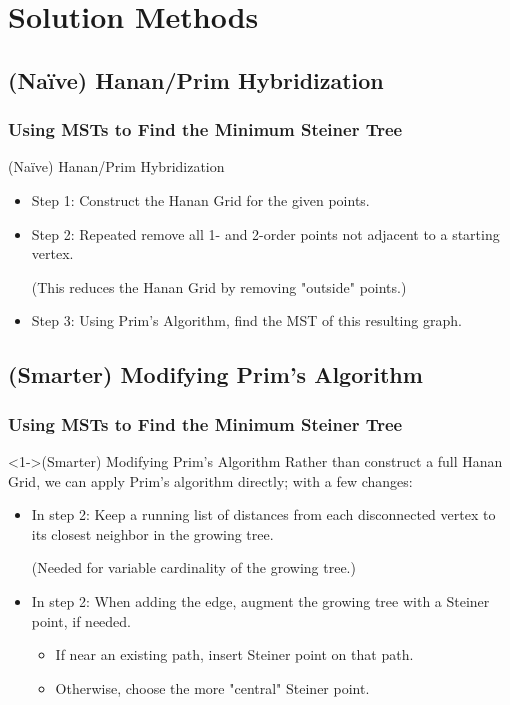 \documentclass{beamer}
\begin{document}
\section{Solution Methods}

\subsection{(Na\"{i}ve) Hanan/Prim Hybridization}
\begin{frame}
\frametitle{Using MSTs to Find the Minimum Steiner Tree}
\begin{block}{(Na\"{i}ve) Hanan/Prim Hybridization}
\begin{itemize}
\item<1-> {
	Step 1: Construct the Hanan Grid for the given points.
}
\item<2-> {
	Step 2: Repeated remove all 1- and 2-order points not adjacent to a starting vertex.
	
	(This reduces the Hanan Grid by removing "outside" points.)
}
\item<4-> {
	Step 3: Using Prim's Algorithm, find the MST of this resulting graph. 
}
\end{itemize}
\end{block}
\end{frame}

\subsection{(Smarter) Modifying Prim's Algorithm}
\begin{frame}
\frametitle{Using MSTs to Find the Minimum Steiner Tree}
\begin{block}<1->{(Smarter) Modifying Prim's Algorithm}
 {Rather than construct a full Hanan Grid, we can apply Prim's algorithm directly; with a few
changes:}
\begin{itemize}
\item<2-> {
In step 2: Keep a running list of distances from each disconnected vertex to its
closest neighbor in the growing tree.

 {(Needed for variable cardinality of the growing tree.)}
}
\item<3-> {
In step 2: When adding the edge, augment the growing tree with a Steiner point, if needed.

	\begin{itemize}
	\item<4-> {If near an existing path, insert Steiner point on that path.}
	\item<5-> {Otherwise, choose the more "central" Steiner point.}
	\end{itemize}
}
\end{itemize}
\end{block}
\end{frame}
\end{document}

